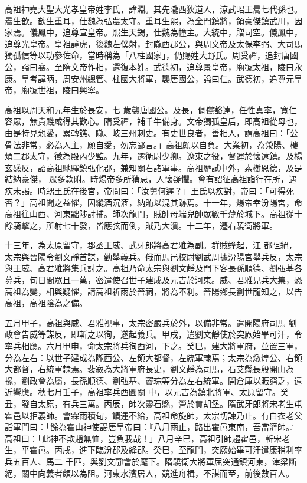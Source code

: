 
\begin{pinyinscope}

 高祖神堯大聖大光孝皇帝姓李氏，諱淵。其先隴西狄道人，涼武昭王暠七代孫也。暠生歆。歆生重耳，仕魏為弘農太守。重耳生熙，為金門鎮將，領豪傑鎮武川，因家焉。儀鳳中，追尊宣皇帝。熙生天錫，仕魏為幢主。大統中，贈司空。儀鳳中，追尊光皇帝。皇祖諱虎，後魏左僕射，封隴西郡公，與周文帝及太保李弼、大司馬獨孤信等以功參佐命，當時稱為「八柱國家」，仍賜姓大野氏。周受禪，追封唐國公，謚曰襄。至隋文帝作相，還復本姓。武德初，追尊景皇帝，廟號太祖，陵曰永康。皇考諱昞，周安州總管、柱國大將軍，襲唐國公，謚曰仁。武德初，追尊元皇帝，廟號世祖，陵曰興寧。



 高祖以周天和元年生於長安，七
 歲襲唐國公。及長，倜儻豁達，任性真率，寬仁容眾，無貴賤咸得其歡心。隋受禪，補千牛備身。文帝獨孤皇后，即高祖從母也，由是特見親愛，累轉譙、隴、岐三州刺史。有史世良者，善相人，謂高祖曰：「公骨法非常，必為人主，願自愛，勿忘鄙言。」高祖頗以自負。大業初，為滎陽、樓煩二郡太守，徵為殿內少監。九年，遷衛尉少卿。遼東之役，督運於懷遠鎮。及楊玄感反，詔高祖馳驛鎮弘化郡，兼知關右諸軍事。高祖歷試中外，素樹恩德，及是結納豪傑，
 眾多款附。時煬帝多所猜忌，人懷疑懼。會有詔征高祖詣行在所，遇疾未謁。時甥王氏在後宮，帝問曰：「汝舅何遲？」王氏以疾對，帝曰：「可得死否？」高祖聞之益懼，因縱酒沉湎，納賄以混其跡焉。十一年，煬帝幸汾陽宮，命高祖往山西、河東黜陟討捕。師次龍門，賊帥母端兒帥眾數千薄於城下。高祖從十餘騎擊之，所射七十發，皆應弦而倒，賊乃大潰。十二年，遷右驍衛將軍。



 十三年，為太原留守，郡丞王威、武牙郎將高君雅為副。群賊蜂起，江
 都阻絕，太宗與晉陽令劉文靜首謀，勸舉義兵。俄而馬邑校尉劉武周據汾陽宮舉兵反，太宗與王威、高君雅將集兵討之。高祖乃命太宗與劉文靜及門下客長孫順德、劉弘基各募兵，旬日間眾且一萬，密遣使召世子建成及元吉於河東。威、君雅見兵大集，恐高祖為變，相與疑懼，請高祖祈雨於晉祠，將為不利。晉陽鄉長劉世龍知之，以告高祖，高祖陰為之備。



 五月甲子，高祖與威、君雅視事，太宗密嚴兵於外，以備非常。遣開陽府司馬
 劉政會告威等謀反，即斬之以徇，遂起義兵。甲戌，遣劉文靜使於突厥始畢可汗，令率兵相應。六月甲申，命太宗將兵徇西河，下之。癸巳，建大將軍府，並置三軍，分為左右：以世子建成為隴西公、左領大都督，左統軍隸焉；太宗為燉煌公、右領大都督，右統軍隸焉。裴寂為大將軍府長史，劉文靜為司馬，石艾縣長殷開山為掾，劉政會為屬，長孫順德、劉弘基、竇琮等分為左右統軍。開倉庫以賑窮乏，遠近響應。秋七月壬子，高祖率兵西圖關
 中，以元吉為鎮北將軍、太原留守。癸丑，發自太原，有兵三萬。丙辰，師次靈石縣，營於賈胡堡。隋武牙郎將宋老生屯霍邑以拒義師。會霖雨積旬，饋運不給，高祖命旋師，太宗切諫乃止。有白衣老父詣軍門曰：「餘為霍山神使謁唐皇帝曰：『八月雨止，路出霍邑東南，吾當濟師。』高祖曰：「此神不欺趙無恤，豈負我哉！」八月辛巳，高祖引師趨霍邑，斬宋老生，平霍邑。丙戌，進下臨汾郡及絳郡。癸巳，至龍門，突厥始畢可汗遣康稍利率兵五百人、馬二
 千匹，與劉文靜會於麾下。隋驍衛大將軍屈突通鎮河東，津梁斷絕，關中向義者頗以為阻。河東水濱居人，競進舟楫，不謀而至，前後數百人。




\end{pinyinscope}
